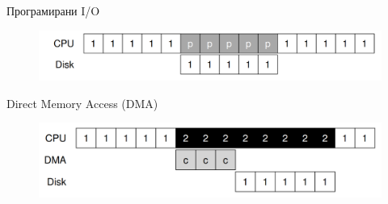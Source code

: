 \documentclass[xcolor=table]{beamer}
\begin{document}
    \begin{frame}{Програмирани I/O}
        \begin{figure}
            \centering
            \includegraphics[width=\textwidth,height=0.8\textheight,keepaspectratio]{images/prog_io.png}
            \label{fig:prog_io.png}
        \end{figure}
    \end{frame}
    
    \begin{frame}{Direct Memory Access (DMA)}
        \begin{figure}
            \centering
            \includegraphics[width=\textwidth,height=0.8\textheight,keepaspectratio]{images/dma.png}
            \label{fig:dma.png}
        \end{figure}
    \end{frame}
    
\end{document}
